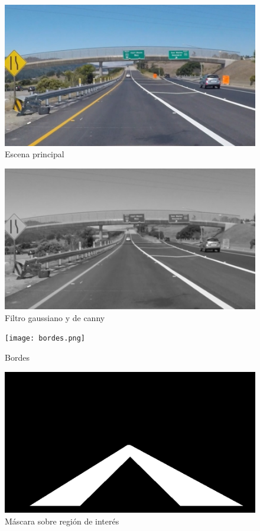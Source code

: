 \documentclass[10pt]{IEEEtran}
\begin{document}



\begin{figure}[h]
\includegraphics[scale = 0.2]{exit_ramp.jpg}
\caption{Escena principal}
\label{fig:exit_ramp}
\end{figure}

\begin{figure}
\includegraphics[scale = 0.25]{grises.png}
\caption{Filtro gaussiano y de canny}
\label{fig:grises}
\end{figure}

\begin{figure}
\texttt{[image: bordes.png]}
\caption{Bordes}
\label{fig:bordes}
\end{figure}

\begin{figure}
\includegraphics[scale = 0.25]{mascara.png}
\caption{Máscara sobre región de interés}
\label{fig:mascara}
\end{figure}
\end{document}
